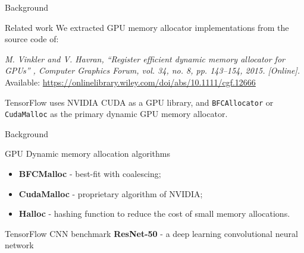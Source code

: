 \documentclass[10pt]{beamer}
\begin{document}
\begin{frame}[fragile]{Background}


\begin{exampleblock}{Related work}
We extracted GPU memory allocator implementations from the source code of:

\textit{M. Vinkler and V. Havran, “Register efficient dynamic memory allocator for GPUs” , Computer Graphics Forum, vol. 34, no. 8, pp. 143–154, 2015. [Online].} Available: \url{https://onlinelibrary.wiley.com/doi/abs/10.1111/cgf.12666}

TensorFlow uses NVIDIA CUDA as a GPU library, and \texttt{BFCAllocator} or \texttt{CudaMalloc} as the primary dynamic GPU memory allocator.
\end{exampleblock}
\end{frame}

\begin{frame}[fragile]{Background}


\begin{alertblock}{GPU Dynamic memory allocation algorithms}
 \begin{itemize}
     \item \textbf{BFCMalloc} - best-fit with coalescing;
     \item \textbf{CudaMalloc} - proprietary algorithm of NVIDIA;
     \item \textbf{Halloc} - hashing function to reduce the cost of small memory allocations.
 \end{itemize}
\end{alertblock}

\begin{exampleblock}{TensorFlow CNN benchmark}
    \textbf{ResNet-50} - a deep learning convolutional neural network
\end{exampleblock}

\end{frame}

\end{document}
